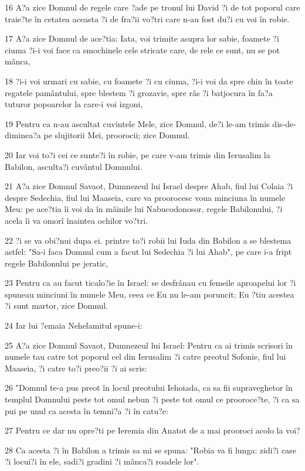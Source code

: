 \par 16 A?a zice Domnul de regele care ?ade pe tronul lui David ?i de tot poporul care traie?te în cetatea aceasta ?i de fra?ii vo?tri care n-au fost du?i cu voi în robie.
\par 17 A?a zice Domnul de ace?tia: Iata, voi trimite asupra lor sabie, foamete ?i ciuma ?i-i voi face ca smochinele cele stricate care, de rele ce sunt, nu se pot mânca,
\par 18 ?i-i voi urmari cu sabie, cu foamete ?i cu ciuma, ?i-i voi da spre chin în toate regatele pamântului, spre blestem ?i grozavie, spre râs ?i batjocura în fa?a tuturor popoarelor la care-i voi izgoni,
\par 19 Pentru ca n-au ascultat cuvintele Mele, zice Domnul, de?i le-am trimis dis-de-diminea?a pe slujitorii Mei, proorocii; zice Domnul.
\par 20 Iar voi to?i cei ce sunte?i în robie, pe care v-am trimis din Ierusalim la Babilon, asculta?i cuvântul Domnului.
\par 21 A?a zice Domnul Savaot, Dumnezeul lui Israel despre Ahab, fiul lui Colaia ?i despre Sedechia, fiul lui Maaseia, care va proorocesc voua minciuna în numele Meu: pe ace?tia îi voi da în mâinile lui Nabucodonosor, regele Babilonului, ?i acela îi va omorî înaintea ochilor vo?tri.
\par 22 ?i se va obi?nui dupa ei. printre to?i robii lui Iuda din Babilon a se blestema astfel: "Sa-i faca Domnul cum a facut lui Sedechia ?i lui Ahab", pe care i-a fript regele Babilonului pe jeratic,
\par 23 Pentru ca au facut ticalo?ie în Israel: se desfrânau cu femeile aproapelui lor ?i spuneau minciuni în numele Meu, ceea ce Eu nu le-am poruncit; Eu ?tiu acestea ?i sunt martor, zice Domnul.
\par 24 Iar lui ?emaia Nehelamitul spune-i:
\par 25 A?a zice Domnul Savaot, Dumnezeul lui Israel: Pentru ca ai trimis scrisori în numele tau catre tot poporul cel din Ierusalim ?i catre preotul Sofonie, fiul lui Maaseia, ?i catre to?i preo?ii ?i ai scris:
\par 26 "Domnul te-a pus preot în locul preotului Iehoiada, ca sa fii supraveghetor în templul Domnului peste tot omul nebun ?i peste tot omul ce prooroce?te, ?i ca sa pui pe unul ca acesta în temni?a ?i în catu?e:
\par 27 Pentru ce dar nu opre?ti pe Ieremia din Anatot de a mai prooroci acolo la voi?
\par 28 Ca acesta ?i în Babilon a trimis sa mi se spuna: "Robia va fi lunga: zidi?i case ?i locui?i în ele, sadi?i gradini ?i mânca?i roadele lor".
